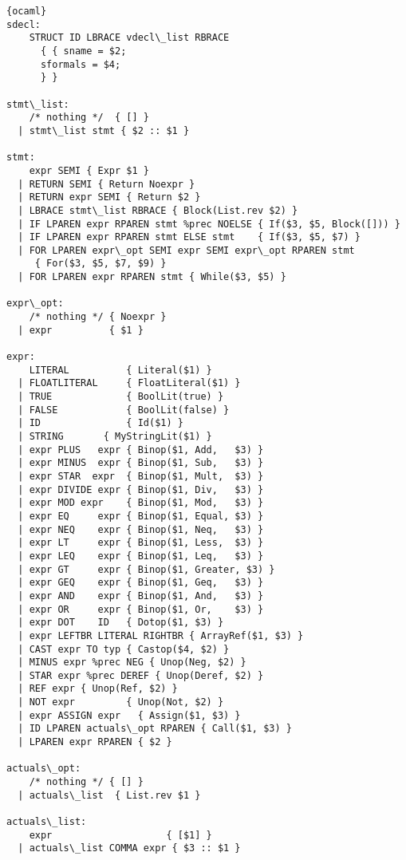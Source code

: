 \begin{lstlisting}{ocaml}
sdecl:
    STRUCT ID LBRACE vdecl\_list RBRACE
      { { sname = $2;
      sformals = $4;
      } }

stmt\_list:
    /* nothing */  { [] }
  | stmt\_list stmt { $2 :: $1 }

stmt:
    expr SEMI { Expr $1 }
  | RETURN SEMI { Return Noexpr }
  | RETURN expr SEMI { Return $2 }
  | LBRACE stmt\_list RBRACE { Block(List.rev $2) }
  | IF LPAREN expr RPAREN stmt %prec NOELSE { If($3, $5, Block([])) }
  | IF LPAREN expr RPAREN stmt ELSE stmt    { If($3, $5, $7) }
  | FOR LPAREN expr\_opt SEMI expr SEMI expr\_opt RPAREN stmt
     { For($3, $5, $7, $9) }
  | FOR LPAREN expr RPAREN stmt { While($3, $5) }

expr\_opt:
    /* nothing */ { Noexpr }
  | expr          { $1 }

expr:
    LITERAL          { Literal($1) }
  | FLOATLITERAL     { FloatLiteral($1) }
  | TRUE             { BoolLit(true) }
  | FALSE            { BoolLit(false) }
  | ID               { Id($1) }
  | STRING	     { MyStringLit($1) }
  | expr PLUS   expr { Binop($1, Add,   $3) }
  | expr MINUS  expr { Binop($1, Sub,   $3) }
  | expr STAR  expr  { Binop($1, Mult,  $3) }
  | expr DIVIDE expr { Binop($1, Div,   $3) }
  | expr MOD expr    { Binop($1, Mod,   $3) }
  | expr EQ     expr { Binop($1, Equal, $3) }
  | expr NEQ    expr { Binop($1, Neq,   $3) }
  | expr LT     expr { Binop($1, Less,  $3) }
  | expr LEQ    expr { Binop($1, Leq,   $3) }
  | expr GT     expr { Binop($1, Greater, $3) }
  | expr GEQ    expr { Binop($1, Geq,   $3) }
  | expr AND    expr { Binop($1, And,   $3) }
  | expr OR     expr { Binop($1, Or,    $3) }
  | expr DOT    ID   { Dotop($1, $3) }
  | expr LEFTBR LITERAL RIGHTBR { ArrayRef($1, $3) }
  | CAST expr TO typ { Castop($4, $2) }
  | MINUS expr %prec NEG { Unop(Neg, $2) }
  | STAR expr %prec DEREF { Unop(Deref, $2) }
  | REF expr { Unop(Ref, $2) }
  | NOT expr         { Unop(Not, $2) }
  | expr ASSIGN expr   { Assign($1, $3) }
  | ID LPAREN actuals\_opt RPAREN { Call($1, $3) }
  | LPAREN expr RPAREN { $2 }

actuals\_opt:
    /* nothing */ { [] }
  | actuals\_list  { List.rev $1 }

actuals\_list:
    expr                    { [$1] }
  | actuals\_list COMMA expr { $3 :: $1 }
\end{lstlisting}
